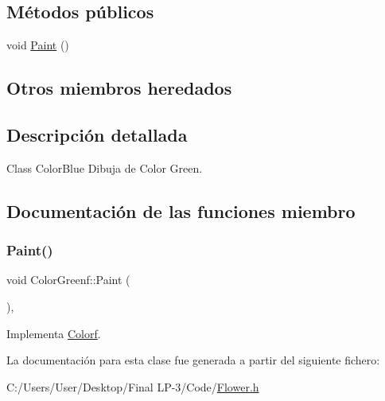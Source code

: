 \subsection*{Métodos públicos}
\begin{DoxyCompactItemize}
\item 
void \mbox{\hyperlink{class_color_greenf_a4761a355c68e45c84b0cfb4893c4d18b}{Paint}} ()
\end{DoxyCompactItemize}
\subsection*{Otros miembros heredados}


\subsection{Descripción detallada}
Class Color\+Blue Dibuja de Color Green. 

\subsection{Documentación de las funciones miembro}
\mbox{\label{class_color_greenf_a4761a355c68e45c84b0cfb4893c4d18b}} 
\subsubsection{\texorpdfstring{Paint()}{Paint()}}
{\footnotesize\ttfamily void Color\+Greenf\+::\+Paint (\begin{DoxyParamCaption}{ }\end{DoxyParamCaption})\hspace{0.3cm}{\ttfamily [inline]}, {\ttfamily [virtual]}}



Implementa \mbox{\hyperlink{class_colorf_a0f98347b94d26eec7f53b33f71c10a66}{Colorf}}.



La documentación para esta clase fue generada a partir del siguiente fichero\+:\begin{DoxyCompactItemize}
\item 
C\+:/\+Users/\+User/\+Desktop/\+Final L\+P-\/3/\+Code/\mbox{\hyperlink{_flower_8h}{Flower.\+h}}\end{DoxyCompactItemize}
